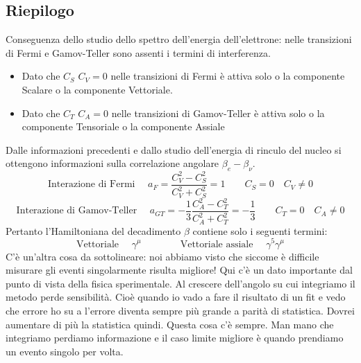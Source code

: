 \subsection{Riepilogo}
Conseguenza dello studio dello spettro dell'energia dell'elettrone: nelle transizioni di Fermi e Gamov-Teller sono assenti i termini di interferenza. 
\begin{itemize}
	\item Dato che $C_S$ $C_V=0$ nelle transizioni di Fermi è attiva solo o la componente Scalare o la componente Vettoriale.
	\item Dato che $C_T$ $C_A=0$ nelle transizioni di Gamov-Teller è attiva solo o la componente Tensoriale o la componente Assiale
\end{itemize}
Dalle informazioni precedenti e dallo studio dell'energia di rinculo del nucleo si ottengono informazioni sulla correlazione angolare $\beta_e-\beta_\nu$.
$$
\text{Interazione di Fermi } \quad a_F=\frac{C_V^2-C_S^2}{C_V^2+C_S^2}=1 \qquad C_S=0 \quad C_V\not=0
$$
$$
\text{Interazione di Gamov-Teller } \quad a_{GT}=-\frac{1}{3}\frac{C_A^2-C_T^2}{C_A^2+C_T^2}=-\frac{1}{3} \qquad C_T=0 \quad C_A\not=0
$$
Pertanto l'Hamiltoniana del decadimento $\beta$ contiene solo i seguenti termini:
$$
\text{Vettoriale } \quad \gamma^\mu \qquad \qquad \text{Vettoriale assiale } \quad \gamma^5\gamma^\mu
$$
C'è un'altra cosa da sottolineare: noi abbiamo visto che siccome è difficile misurare gli eventi singolarmente risulta migliore! Qui c'è un dato importante dal punto di vista della fisica sperimentale. Al crescere dell'angolo su cui integriamo il metodo perde sensibilità. Cioè quando io vado a fare il risultato di un fit e vedo che errore ho su a l'errore diventa sempre più grande a parità di statistica. Dovrei aumentare di più la statistica quindi. Questa cosa c'è sempre. Man mano che integriamo perdiamo informazione e il caso limite migliore è quando prendiamo un evento singolo per volta. 
